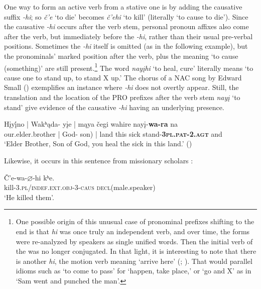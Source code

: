 \documentclass[output=paper]{LSP/langsci}
\begin{document}
One way to form an active verb from a stative one is by adding the causative suffix \textit{-hi}; so \textit{\v{c}'e} `to die' becomes \textit{\v{c}'ehi} `to kill' (literally `to cause to die'). Since the causative \textit{-hi} occurs after the verb stem, personal pronoun affixes also come after the verb, but immediately before the \textit{-hi}, rather than their usual pre-verbal positions.  Sometimes the \textit{-hi} itself is omitted (as in the following example), but the pronominals' marked position after the verb, plus the meaning `to cause (something)' are still present.\footnote{One possible origin of this unusual case of pronominal prefixes shifting to the end is that \textit{hi} was once truly an independent verb, and over time, the forms were re-analyzed by speakers as single unified words. Then the initial verb of the  was no longer conjugated. In that light, it is interesting to note that there is another \textit{hi}, the motion verb meaning `arrive here' (\citealt{Taylor1976a}; \citealt{Hopkins1988}). That would parallel  idioms such as `to come to pass' for `happen, take place,' or `go and X' as in `Sam went and punched the man'.}  The word \textit{nay\k{i}hi}  `to heal, cure' literally means `to cause one to stand up, to stand X up.'  The chorus of a NAC song by Edward Small () exemplifies an instance where  \textit{-hi} does not overtly appear.  Still, the translation and the location of the PRO prefixes after the verb stem \textit{nay\k{i}} `to stand' give evidence of the causative \textit{-hi} having an underlying presence.

\begin{exe}
\ex \gll H\k{i}y\k{í}no | Wakʰ\k{a}da- y\k{i}e   | m\k{a}ya  \v{c}egi  wahire nay\k{i}-\textbf{wa-ra} na \\
our.elder.brother | God- son)    | land   this   sick      stand-\textbf{\textsc{3pl.pat-2.agt}} and\\
\trans `Elder Brother, Son of God, you heal the sick in this land.' (\citealt{Davidson1997})
 \end{exe}

Likewise, it occurs in this sentence from missionary scholars \citet[43: \#53]{HamiltonIrvin1848}:
\begin{exe}
\ex \gll \v{C}'e-wa-{\ob}$\varnothing${\cb}-hi       kʰe. \\
   	kill-3.\textsc{pl/indef.ext.obj}-3-\textsc{caus} \textsc{decl}(male.speaker)  \\
\trans `He killed them'.	
\end{exe}
\end{document}
